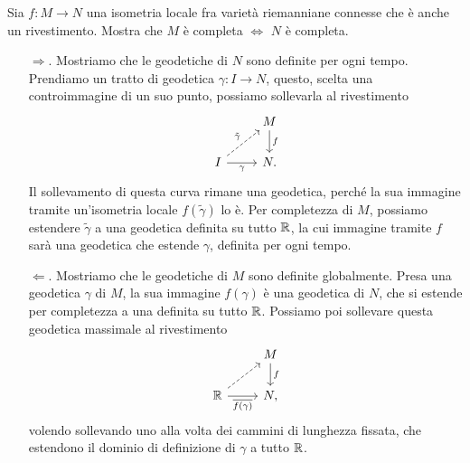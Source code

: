 \documentclass[a4paper]{article}
\begin{document}
\begin{ex}[11.3]{Sia $ f \colon M \to N $ una isometria locale fra varietà riemanniane connesse che è anche un rivestimento. Mostra che $ M $ è completa $ \iff $ $ N $ è completa.}
	
	\begin{itemize}
		\item[$ \Rightarrow $.] Mostriamo che le geodetiche di $ N $ sono definite per ogni tempo. Prendiamo un tratto di geodetica $ \gamma\colon I \to N $, questo, scelta una controimmagine di un suo punto, possiamo sollevarla al rivestimento
		\[ \begin{tikzcd}
		 & M \dar["f"] \\
		 I \rar["\gamma" below] \arrow[ur, "\tilde{\gamma}", dashed] & N. 
		\end{tikzcd} \]
		Il sollevamento di questa curva rimane una geodetica, perché la sua immagine tramite un'isometria locale $ f(\tilde{\gamma}) $ lo è. Per completezza di $ M $, possiamo estendere $ \tilde{\gamma} $ a una geodetica definita su tutto $ \mathbb{R} $, la cui immagine tramite $ f $ sarà una geodetica che estende $ \gamma $, definita per ogni tempo.
		
		\item[$ \Leftarrow $.] Mostriamo che le geodetiche di $ M $ sono definite globalmente. Presa una geodetica $ \gamma $ di $ M $, la sua immagine $ f(\gamma) $ è una geodetica di $ N $, che si estende per completezza a una definita su tutto $ \mathbb{R} $. Possiamo poi sollevare questa geodetica massimale al rivestimento
		\[ \begin{tikzcd}
		& M \dar["f"] \\
		\R \rar["\overline{f(\gamma)}" below] \arrow[ur, dashed] & N, 
		\end{tikzcd} \]
		volendo sollevando uno alla volta dei cammini di lunghezza fissata, che estendono il dominio di definizione di $ \gamma $ a tutto $ \mathbb{R} $.
	\end{itemize}
	 
\end{ex}
\end{document}
